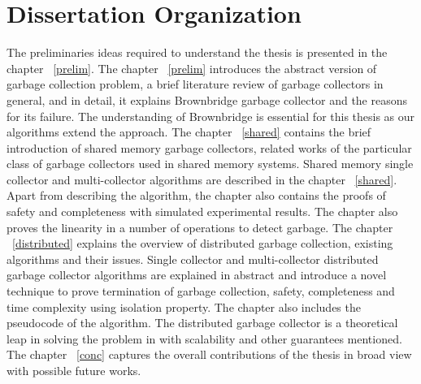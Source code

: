 \section{Dissertation Organization}
\label{intro:do}
The preliminaries ideas required to understand the thesis is presented in the chapter ~\ref{prelim}. The chapter ~\ref{prelim} introduces the abstract version of garbage collection problem, a brief literature review of garbage collectors in general, and in detail, it explains Brownbridge garbage collector and the reasons for its failure. The understanding of Brownbridge is essential for this thesis as our algorithms extend the approach. The chapter ~\ref{shared} contains the brief introduction of shared memory garbage collectors, related works of the particular class of garbage collectors used in shared memory systems. Shared memory single collector and multi-collector algorithms are described in the chapter ~\ref{shared}. Apart from describing the algorithm, the chapter also contains the proofs of safety and completeness with simulated experimental results. The chapter also proves the linearity in a number of operations to detect garbage. The chapter ~\ref{distributed} explains the overview of distributed garbage collection, existing algorithms and their issues. Single collector and multi-collector distributed garbage collector algorithms are explained in abstract and introduce a novel technique to prove termination of garbage collection, safety, completeness and time complexity using isolation property. The chapter also includes the pseudocode of the algorithm. The distributed garbage collector is a theoretical leap in solving the problem in with scalability and other guarantees mentioned. The chapter ~\ref{conc} captures the overall contributions of the thesis in broad view with possible future works.
